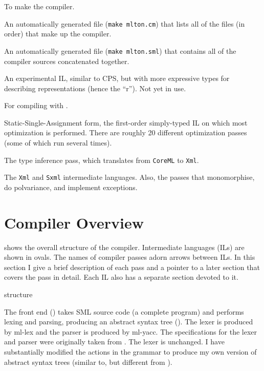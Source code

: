 \begin{description}
To make the compiler.

An automatically generated file ({\tt make mlton.cm}) that lists all of the
files (in order) that make up the compiler.

An automatically generated file ({\tt make mlton.sml}) that contains all of the
compiler sources concatenated together.

An experimental IL, similar to CPS, but with more expressive types for
describing representations (hence the ``r'').  Not yet in use.

For compiling with {\smlnj}.

Static-Single-Assignment form, the first-order simply-typed IL on which most
optimization is performed.  There are roughly 20 different optimization passes
(some of which run several times).

The type inference pass, which translates from {\tt CoreML} to {\tt Xml}.

The {\tt Xml} and {\tt Sxml} intermediate languages.  Also, the passes that
monomorphise, do polvariance, and implement exceptions.

\end{description}

\section{Compiler Overview}

 shows the overall structure of the compiler.  Intermediate
languages (ILs) are shown in ovals.  The names of compiler passes adorn arrows
between ILs.  In this section I give a brief description of each pass and a
pointer to a later section that covers the pass in detail.  Each IL also has a
separate section devoted to it.
\figBegin
\centerline{}
       {structure}

The front end () takes SML source code (a complete
program) and performs lexing and parsing, producing an abstract syntax
tree ().  The lexer is produced by
ml-lex\cite{AppelEtAl94} and the parser is produced by
ml-yacc\cite{TarditiAppel94}.  The specifications for 
the lexer and parser were originally taken from .  The
lexer is unchanged.  I have substantially modified the actions in the
grammar to produce my own version of abstract syntax trees (similar
to, but different from {\smlnj}).

